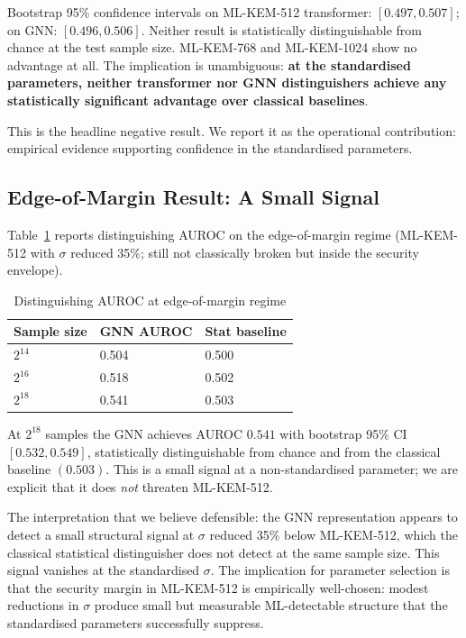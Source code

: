 \documentclass[sigconf,nonacm]{acmart}
\begin{document}
Bootstrap 95\% confidence intervals on ML-KEM-512 transformer:
$[0.497, 0.507]$; on GNN: $[0.496, 0.506]$. Neither result is
statistically distinguishable from chance at the test sample size.
ML-KEM-768 and ML-KEM-1024 show no advantage at all. The
implication is unambiguous: \textbf{at the standardised parameters,
neither transformer nor GNN distinguishers achieve any
statistically significant advantage over classical baselines}.

This is the headline negative result. We report it as the
operational contribution: empirical evidence supporting confidence
in the standardised parameters.

\subsection{Edge-of-Margin Result: A Small Signal}

Table~\ref{tab:edge} reports distinguishing AUROC on the
edge-of-margin regime (ML-KEM-512 with $\sigma$ reduced 35\%; still
not classically broken but inside the security envelope).

\begin{table}[h]
\caption{Distinguishing AUROC at edge-of-margin regime}
\label{tab:edge}
\small
\begin{tabularx}{\columnwidth}{@{}p{2.4cm}X X@{}}
\toprule
\textbf{Sample size} & \textbf{GNN AUROC} & \textbf{Stat baseline} \\
\midrule
$2^{14}$    & 0.504 & 0.500 \\
$2^{16}$    & 0.518 & 0.502 \\
$2^{18}$    & 0.541 & 0.503 \\
\bottomrule
\end{tabularx}
\end{table}

At $2^{18}$ samples the GNN achieves AUROC $0.541$ with bootstrap
95\% CI $[0.532, 0.549]$, statistically distinguishable from
chance and from the classical baseline $(0.503)$. This is a small
signal at a non-standardised parameter; we are explicit that it
does \emph{not} threaten ML-KEM-512.

The interpretation that we believe defensible: the GNN representation
appears to detect a small structural signal at $\sigma$ reduced 35\%
below ML-KEM-512, which the classical statistical distinguisher does
not detect at the same sample size. This signal vanishes at the
standardised $\sigma$. The implication for parameter selection is
that the security margin in ML-KEM-512 is empirically well-chosen:
modest reductions in $\sigma$ produce small but measurable ML-detectable
structure that the standardised parameters successfully suppress.
\end{document}
